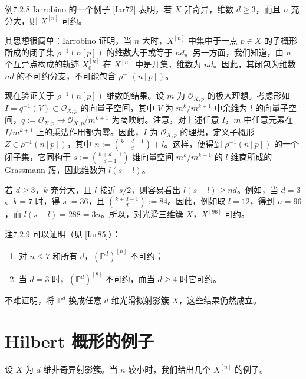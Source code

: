 \begin{origstatement}{例}{7.2.8}\label{ch07:7.2.8}
Iarrobino 的一个例子 [Iar72] 表明，若 $X$ 非奇异，维数 $d\geq3$，而且 $n$ 充分大，则 $X^{[n]}$ 可约。

其思想很简单：Iarrobino 证明，当 $n$ 大时，$X^{[n]}$ 中集中于一点 $p\in X$ 的子概形所成的闭子集 $\rho^{-1}(n[p])$ 的维数大于或等于 $nd$。另一方面，我们知道，由 $n$ 个互异点构成的轨迹 $X_0^{[n]}$ 在 $X^{[n]}$ 中是开集，维数为 $nd$。因此，其闭包为维数 $nd$ 的不可约分支，不可能包含 $\rho^{-1}(n[p])$。

现在验证关于 $\rho^{-1}(n[p])$ 维数的结果。设 $m$ 为 $\mathcal O_{X,p}$ 的极大理想。考虑形如 $I=q^{-1}(V)\subset\mathcal O_{X,p}$ 的向量子空间，其中 $V$ 为 $m^k/m^{k+1}$ 中余维为 $l$ 的向量子空间，$q:=\mathcal O_{X,p}\to\mathcal O_{X,p}/m^{k+1}$ 为商映射。注意，对上述任意 $I$，$m$ 中任意元素在 $I/m^{k+1}$ 上的乘法作用都为零。因此，$I$ 为 $\mathcal O_{X,p}$ 的理想，定义子概形 $Z\in\rho^{-1}(n[p])$，其中 $n:=\binom{k+d-1}{d}+l$。这样，便得到 $\rho^{-1}(n[p])$ 的一个闭子集，它同构于 $s:=\binom{k+d-1}{d-1}$ 维向量空间 $m^k/m^{k+1}$ 的 $l$ 维商所成的 Grassmann 簇，因此维数为 $l(s-l)$。

若 $d\geq3$，$k$ 充分大，且 $l$ 接近 $s/2$，则容易看出 $l(s-l)\geq nd$。例如，当 $d=3$、$k=7$ 时，得 $s:=36$，且 $\binom{k+d-1}{d}:=84$。因此，例如取 $l=12$，得到 $n=96$，而 $l(s-l)=288=3n$。所以，对光滑三维簇 $X$，$X^{[96]}$ 可约。
\end{origstatement}
\begin{origstatement}{注}{7.2.9}\label{ch07:7.2.9}
可以证明（见 [Iar85]）：
\begin{enumerate}[label=(\arabic*)]
\item 对 $n\leq7$ 和所有 $d$，$(\mathbb P^d)^{[n]}$ 不可约；
\item 当 $d=3$ 时，$(\mathbb P^d)^{[8]}$ 不可约，而当 $d\geq4$ 时它可约。
\end{enumerate}
不难证明，将 $\mathbb P^d$ 换成任意 $d$ 维光滑拟射影簇 $X$，这些结果仍然成立。
\end{origstatement}
\section{Hilbert 概形的例子}
设 $X$ 为 $d$ 维非奇异射影簇。当 $n$ 较小时，我们给出几个 $X^{[n]}$ 的例子。


